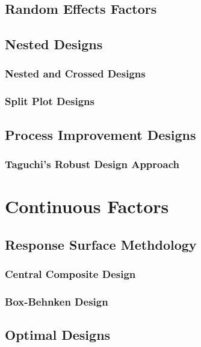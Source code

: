 \subsection{Random Effects Factors}

\subsection{Nested Designs}


\subsubsection{Nested and Crossed Designs}

\subsubsection{Split Plot Designs}




\subsection{Process Improvement Designs}



\subsubsection{Taguchi's Robust Design Approach}



\section{Continuous Factors}



\subsection{Response Surface Methdology}
\label{sec:response_surface}

\subsubsection{Central Composite Design}

\subsubsection{Box-Behnken Design}

\subsection{Optimal Designs}

